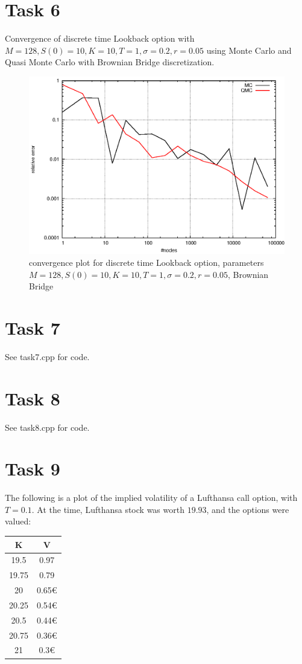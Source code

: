 \documentclass[]{article}
\begin{document}
\section*{Task 6}
Convergence of discrete time Lookback option with $M=128,S(0)=10,K=10,T=1,\sigma=0.2,r=0.05$ using Monte Carlo and Quasi Monte Carlo with Brownian Bridge discretization.
\begin{figure}[!ht]
\centering
\includegraphics[width=.9\textwidth]{task6.eps}
\caption{convergence plot for discrete time Lookback option, parameters $M=128,S(0)=10,K=10,T=1,\sigma=0.2,r=0.05$, Brownian Bridge}
\label{fig:Task6}
\end{figure}

\section*{Task 7}
See task7.cpp for code.

\section*{Task 8}
See task8.cpp for code.
\clearpage

\section*{Task 9}
The following is a plot of the implied volatility of a Lufthansa call option, with $T=0.1$. At the time, Lufthansa stock was worth $19.93$, and the options were valued:\\

\centering
\begin{tabular}[ht]{c|c}
K & V\\
\hline
19.5&0.97\\
19.75&0.79\\
20&0.65€\\
20.25&0.54€\\
20.5&0.44€\\
20.75&0.36€\\
21&0.3€\\
\end{tabular}
\end{document}
